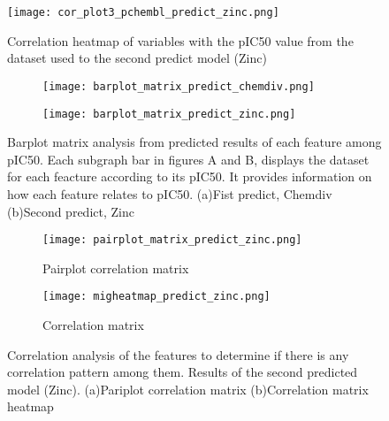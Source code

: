 \documentclass[final,times,twocolumn,article]{elsarticle}
\begin{document}
 \begin{figure}[h]
    \centering 
     \texttt{[image: cor\_plot3\_pchembl\_predict\_zinc.png]}	
     \caption{Correlation heatmap of variables with the pIC50 value from the dataset used to the second predict model (Zinc)} 
     \label{Figure11}
 \end{figure}

 \begin{figure*}
    \centering
    \begin{subfigure}{1\textwidth}
        \centering
        \texttt{[image: barplot\_matrix\_predict\_chemdiv.png]} 
        \caption{}
    \end{subfigure}
    \begin{subfigure}{1\textwidth}
        \centering
        \texttt{[image: barplot\_matrix\_predict\_zinc.png]}
        \caption{}
    \end{subfigure}
    
    \caption{Barplot matrix analysis from predicted results of each feature among pIC50. Each subgraph bar in figures A and B, displays the dataset for each feacture according to its pIC50. It provides information on how each feature relates to pIC50. (a)Fist predict, Chemdiv (b)Second predict, Zinc }
    \label{Figure12}
\end{figure*}


 \begin{figure*}
    \begin{subfigure}{0.6\textwidth}
        \texttt{[image: pairplot\_matrix\_predict\_zinc.png]} 
        \caption{Pairplot correlation matrix}
    \end{subfigure}
    \hfill
    \begin{subfigure}{0.6\textwidth}
        \texttt{[image: migheatmap\_predict\_zinc.png]}
        \caption{Correlation matrix}
    \end{subfigure}
    
    \caption{ Correlation analysis of the features to determine if there is any correlation pattern among them. Results of the second predicted model (Zinc). (a)Pariplot correlation matrix (b)Correlation matrix heatmap}
    \label{Figure13}
\end{figure*}

\end{document}
